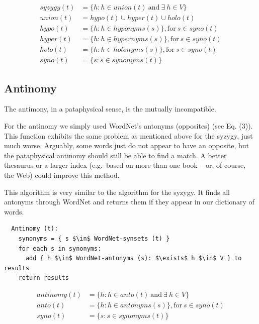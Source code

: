 \begin{equation}
\begin{split}
  syzygy(t) &= \{ h \colon h \in union(t) \ \text{and} \ \exists \ h \in V \}\\%
  union(t) &= hypo(t) \cup hyper(t) \cup holo(t)\\
  hypo(t) &= \{ h \colon h \in hyponyms(s) \}, \text{for} \ s \in syno(t)\\
  hyper(t) &= \{ h \colon h \in hypernyms(s) \}, \text{for} \ s \in syno(t)\\
  holo(t) &= \{ h \colon h \in holonyms(s) \}, \text{for} \ s \in syno(t)\\
  syno(t) &= \{ s \colon s \in synonyms(t) \}
\end{split}
\label{eq:syzygy}
\end{equation}

\subsection{Antinomy}

The antimony, in a pataphysical sense, is the mutually incompatible.

For the antinomy we simply used WordNet’s antonyms (opposites) (see Eq. (3)). This function exhibits the same problem as mentioned above for the syzygy, just much worse.  Arguably, some words just do not appear to have an opposite, but the pataphysical antinomy should still be able to find a match. A better thesaurus or a larger index (e.g.\ based on more than one book – or, of course, the Web) could improve this method.

This algorithm is very similar to the algorithm for the syzygy. It finds all antonyms through WordNet and returns them if they appear in our dictionary of words.

\begin{lstlisting}
  Antinomy (t):
    synonyms = { s $\in$ WordNet-synsets (t) }
    for each s in synonyms:
      add { h $\in$ WordNet-antonyms (s): $\exists$ h $\in$ V } to results
    return results
\end{lstlisting}

\begin{equation}
  \begin{split}
  antinomy( t ) &= \{ h \colon h \in anto( t ) \ \text{and} \ \exists \ h \in V \}\\%
  anto( t ) &= \{ h \colon h \in antonyms( s ) \}, \text{for} \ s \in syno( t )\\
  syno( t ) &= \{ s \colon s \in synonyms( t ) \}
  \end{split}
\label{eq:antinomy}
\end{equation}

